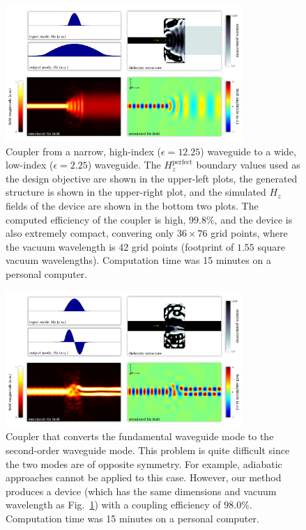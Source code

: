 \begin{figure}[htb]
    \centering
    \includegraphics[width=0.8\textwidth]{p3/1} 
    \caption{Coupler from a narrow, high-index ($\epsilon=12.25$) waveguide to
            a wide, low-index ($\epsilon=2.25$) waveguide. 
        The $H_z^\text{perfect}$ boundary values used as 
            the design objective are shown in the upper-left plots, 
            the generated structure is shown in the upper-right plot, and
            the simulated $H_z$ fields of the device are shown 
            in the bottom two plots.
        The computed efficiency of the coupler is high, $99.8\%$, and
            the device is also extremely compact, 
            convering only $36 \times 76$ grid points,
            where the vacuum wavelength is 42 grid points
            (footprint of $1.55$ square vacuum wavelengths).
        Computation time was 15 minutes on a personal computer.}
    \label{fig:fiber}
\end{figure}
\begin{figure}[htb]
    \centering
    \includegraphics[width=0.8\textwidth]{p3/2} 
    \caption{Coupler that converts the fundamental waveguide mode to the
            second-order waveguide mode.
        This problem is quite difficult since the two modes are of 
            opposite symmetry.
        For example, adiabatic approaches cannot be applied to this case.
        However, our method produces a device 
            (which has the same dimensions and vacuum wavelength as 
            Fig.~\ref{fig:fiber})  
            with a coupling efficiency of $98.0\%$. 
        Computation time was 15 minutes on a personal computer.
        }
    \label{fig:mode}
\end{figure}
